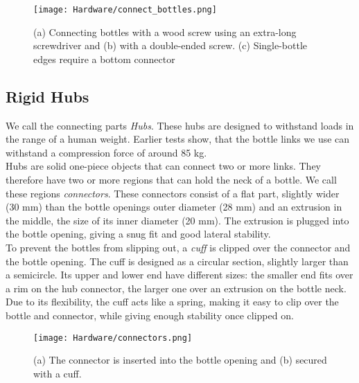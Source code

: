 \begin{figure}[ht!]
    \texttt{[image: Hardware/connect\_bottles.png]}
    \centering
    \caption{(a) Connecting bottles with a wood screw using an extra-long screwdriver and (b) with a double-ended screw. (c) Single-bottle edges require a bottom connector}
    \label{fig:connect_bottles}
\end{figure}

\subsection{Rigid Hubs}
We call the connecting parts \textit{Hubs}. These hubs are designed to withstand loads in the range of a human weight. Earlier tests show, that the bottle links we use can withstand a compression force of around 85 kg.\\
Hubs are solid one-piece objects that can connect two or more links. They therefore have two or more regions that can hold the neck of a bottle. We call these regions \textit{connectors}. These connectors consist of a flat part, slightly wider (30 mm) than the bottle openings outer diameter (28 mm) and an extrusion in the middle, the size of its inner diameter (20 mm). The extrusion is plugged into the bottle opening, giving a snug fit and good lateral stability.\\
To prevent the bottles from slipping out, a \textit{cuff} is clipped over the connector and the bottle opening. The cuff is designed as a circular section, slightly larger than a semicircle. Its upper and lower end have different sizes: the smaller end fits over a rim on the hub connector, the larger one over an extrusion on the bottle neck. Due to its flexibility, the cuff acts like a spring, making it easy to clip over the bottle and connector, while giving enough stability once clipped on.

\begin{figure}
    \texttt{[image: Hardware/connectors.png]}
    \caption{(a) The connector is inserted into the bottle opening and (b) secured with a cuff.}
    \centering
    \label{fig:connector}
\end{figure}


